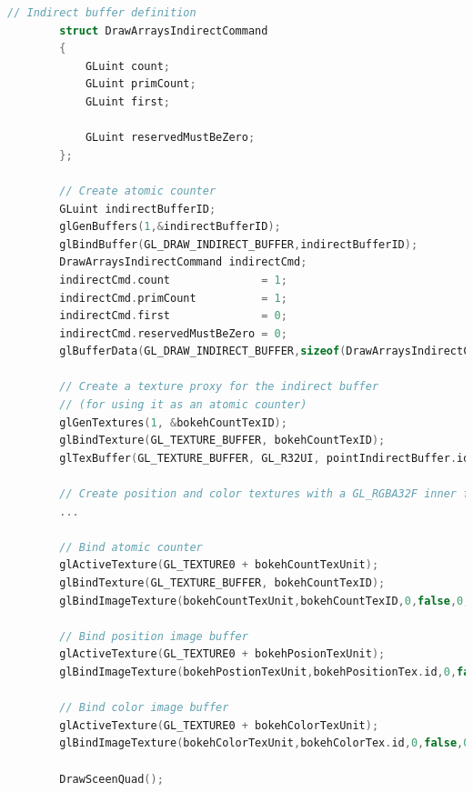 \begin{lstlisting}[language=C++,float={htb},caption={Host application for extracting \bokehs \emph{(Pass 2)}.},label={DeRousiers:bokehextractioncpp}]
		// Indirect buffer definition
		struct DrawArraysIndirectCommand
		{
			GLuint count;
			GLuint primCount;
			GLuint first;

			GLuint reservedMustBeZero;
		};

		// Create atomic counter
		GLuint indirectBufferID;
		glGenBuffers(1,&indirectBufferID);
		glBindBuffer(GL_DRAW_INDIRECT_BUFFER,indirectBufferID);
		DrawArraysIndirectCommand indirectCmd;
		indirectCmd.count              = 1;
		indirectCmd.primCount          = 1;
		indirectCmd.first              = 0;
		indirectCmd.reservedMustBeZero = 0;
		glBufferData(GL_DRAW_INDIRECT_BUFFER,sizeof(DrawArraysIndirectCommand),&indirecCmd,GL_DYNAMIC_DRAW);

		// Create a texture proxy for the indirect buffer 
		// (for using it as an atomic counter)
		glGenTextures(1, &bokehCountTexID);
		glBindTexture(GL_TEXTURE_BUFFER, bokehCountTexID);
		glTexBuffer(GL_TEXTURE_BUFFER, GL_R32UI, pointIndirectBuffer.id);

		// Create position and color textures with a GL_RGBA32F inner format
		...

		// Bind atomic counter
		glActiveTexture(GL_TEXTURE0 + bokehCountTexUnit);
		glBindTexture(GL_TEXTURE_BUFFER, bokehCountTexID);
		glBindImageTexture(bokehCountTexUnit,bokehCountTexID,0,false,0,GL_READ_WRITE,GL_R32UI);

		// Bind position image buffer
		glActiveTexture(GL_TEXTURE0 + bokehPosionTexUnit);
		glBindImageTexture(bokehPostionTexUnit,bokehPositionTex.id,0,false,0,GL_READ_WRITE,GL_RGBA32F);

		// Bind color image buffer
		glActiveTexture(GL_TEXTURE0 + bokehColorTexUnit);
		glBindImageTexture(bokehColorTexUnit,bokehColorTex.id,0,false,0,GL_READ_WRITE,GL_RGBA32F);

		DrawSceenQuad();
\end{lstlisting}



